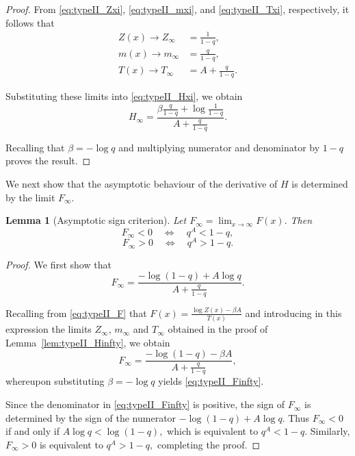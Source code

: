 \documentclass[10pt,a4paper]{amsart}
\newtheorem{lem}[thm]{Lemma}
\theoremstyle{definition}
\theoremstyle{remark}
\numberwithin{equation}{section}
\begin{document}
\begin{proof}
From
\eqref{eq:typeII_Zxi},
\eqref{eq:typeII_mxi},
and
\eqref{eq:typeII_Txi}, respectively, 
it follows that
\begin{align*}
Z(x)\to Z_\infty &= \frac1{1-q}, \\
m(x)\to m_\infty &= \frac{q}{1-q}, \\
T(x)\to T_\infty &= A+\frac{q}{1-q}.
\end{align*}

\noindent Substituting these limits into
\eqref{eq:typeII_Hxi},
we obtain
\[
H_\infty
=
\frac{
\beta\frac{q}{1-q}
+\log\frac1{1-q}
}{
A+\frac{q}{1-q}
}.
\]

\noindent Recalling that
$
\beta=-\log q
$
and multiplying numerator and denominator by
\(
1-q
\)
proves the result.
\end{proof}

We next show that the asymptotic behaviour of the derivative of $H$ is determined by the limit $F_\infty$.

\begin{lem}[Asymptotic sign criterion]
\label{eq:typeII_negative_condition}
Let
$
F_\infty=\lim_{x\to\infty}F(x).
$
Then
\begin{equation*}
F_\infty<0
\quad\Longleftrightarrow\quad
q^A<1-q,
\end{equation*}
\begin{equation*}
F_\infty>0
\quad\Longleftrightarrow\quad
q^A>1-q.
\end{equation*}
\end{lem}

\begin{proof}
We first show that
\begin{equation}
F_\infty
=
\frac{
-\log(1-q)+A\log q
}{
A+\frac{q}{1-q}
}.
\label{eq:typeII_Finfty}
\end{equation}

Recalling from \eqref{eq:typeII_F} that
$
F(x)
=
\frac{
\log Z(x)-\beta A
}{
T(x)
}
$
and introducing in this expression the limits $Z_\infty$, $m_\infty$ and $T_\infty$ obtained in the proof of
Lemma~\ref{lem:typeII_Hinfty},
we obtain
\[
F_\infty
=
\frac{
-\log(1-q)-\beta A
}{
A+\frac{q}{1-q}
},
\]
whereupon substituting
$
\beta=-\log q
$
yields
\eqref{eq:typeII_Finfty}.

Since the denominator in
\eqref{eq:typeII_Finfty}
is positive, the sign of
\(
F_\infty
\)
is determined by the sign of the numerator 
\(
-\log(1-q)+A\log q.
\)
Thus
$
F_\infty<0
$
if and only if
$
A\log q<\log(1-q),
$
which is equivalent to
$
q^A<1-q.
$
Similarly,
$
F_\infty>0
$
is equivalent to
$
q^A>1-q,
$
completing the proof.
\end{proof}
\end{document}
